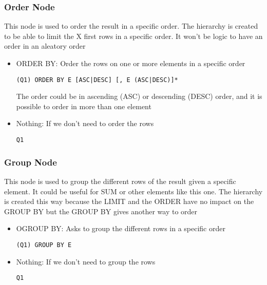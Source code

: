 \documentclass{article}
\begin{document}
\subsubsection{Order Node}
This node is used to order the result in a specific order. The hierarchy is created to be able to limit the X first rows in a specific order. It won't be logic to have an order in an aleatory order
\begin{itemize}
\item ORDER BY: Order the rows on one or more elements in a specific order
\begin{verbatim}
(Q1) ORDER BY E [ASC|DESC] [, E (ASC|DESC)]*
\end{verbatim}
The order could be in ascending (ASC) or descending (DESC) order, and it is possible to order in more than one element
\item Nothing:  If we don't need to order the rows
\begin{verbatim}
Q1
\end{verbatim}
\end{itemize}
\subsubsection{Group Node}
This node is used to group the different rows of the result given a specific element. It could be useful for SUM or other elements like this one. The hierarchy is created this way because the LIMIT and the ORDER have no impact on the GROUP BY but the GROUP BY gives another way to order
\begin{itemize}
\item OGROUP BY: Asks to group the different rows in a specific order
\begin{verbatim}
(Q1) GROUP BY E
\end{verbatim}
\item Nothing:  If we don't need to group the rows
\begin{verbatim}
Q1
\end{verbatim}
\end{itemize}
\end{document}
